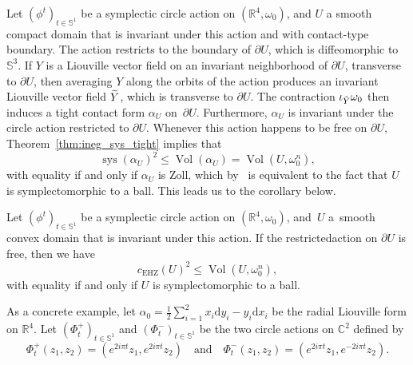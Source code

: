 \documentclass[AHL,Unicode,longabstracts]{cedram}
\DeclareMathOperator{\vol}{Vol}
\DeclareMathOperator{\sys}{sys}
\DeclareMathOperator{\EHZ}{EHZ}
\newcommand{\bbS}{\mathbb{S}}
\newcommand{\bbR}{\mathbb{R}}
\newcommand{\bbC}{\mathbb{C}}
\newcommand{\rmd}{\mathrm{d}}
\let\oldtilde\tilde
\renewcommand*{\tilde}[1]{\mathchoice{\widetilde{#1}}{\widetilde{#1}}{\oldtilde{#1}}{\oldtilde{#1}}}
\newcommand{\bbS}{\mathbb{S}}
\begin{document}
Let $(\phi^t)_{t \in \bbS^1}$ be a symplectic circle action on $(\bbR^4, \omega_0)$, and $U$ a smooth compact domain that is invariant under this action and with contact-type boundary. The action restricts to the boundary of $\partial U$, which is diffeomorphic to $\bbS^3$. If $Y$ is a Liouville vector field on an invariant neighborhood of $\partial U$, transverse to $\partial U$, then averaging $Y$ along the orbits of the action produces an invariant Liouville vector field $\tilde Y$, which is transverse to $\partial U$. The contraction $\iota_{\tilde Y}\omega_0$ then induces a tight contact form $\alpha_U$ on~$\partial U$. Furthermore, $\alpha_U$ is invariant under the circle action restricted to $\partial U$. Whenever this action happens to be free on $\partial U$, Theorem~\ref{thm:ineg_sys_tight} implies that
\[
\sys(\alpha_U)^2 \leq \vol(\alpha_U) = \vol(U, \omega_0^n),
\]
with equality if and only if $\alpha_U$ is Zoll, which by~\cite[Proposition~4.3]{Abbondandolo2018} is equivalent to the fact that $U$ is symplectomorphic to a ball. This leads us to the corol\-lary below.

\begin{coro}\label{coro:viterbo_invariant}
Let $(\phi^t)_{t \in \bbS^1}$ be a symplectic circle action on $(\bbR^4, \omega_0)$, and~$U$ a~smooth convex domain that is invariant under this action. If the restricted\linebreak action on $\partial U$ is free, then we have
\[
c_{\EHZ}(U)^2 \leq \vol(U, \omega_0^n),
\]
with equality if and only if $U$ is symplectomorphic to a ball.
\end{coro}

As a concrete example, let $\alpha_0 = \frac{1}{2}\sum_{i=1}^2 x_i \rmd y_i - y_i \rmd x_i $ be the radial Liouville form on $\bbR^4$. Let $(\Phi_t^+)_{t \in \bbS^1}$ and $(\Phi_t^-)_{t \in \bbS^1}$ be the two circle actions on $\bbC^2$ defined by
\[
\Phi^+_t(z_1, z_2) = \left(e^{2i\pi t} z_1, e^{2i\pi t} z_2\right) \quad \text{and} \quad \Phi^-_t(z_1, z_2) = \left(e^{2i\pi t} z_1, e^{-2i\pi t} z_2\right).
\]
\end{document}
